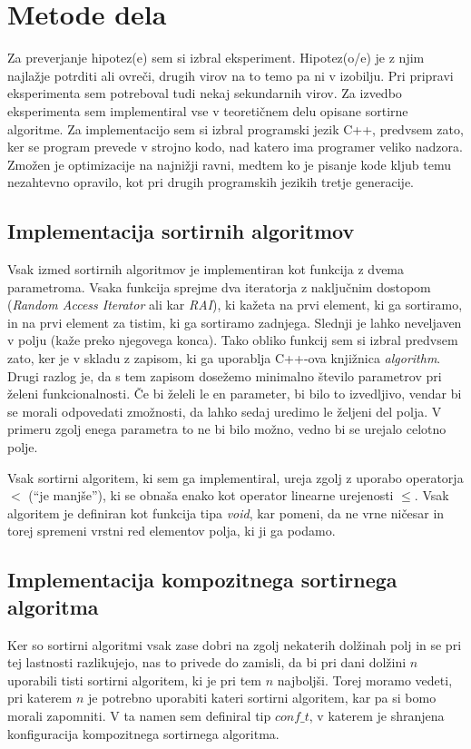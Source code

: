 \documentclass[a4paper,oneside,12pt]{article}
\begin{document}
\section{Metode dela}
Za preverjanje hipotez(e) sem si izbral eksperiment. Hipotez(o/e) je z njim najlažje
potrditi ali ovreči, drugih virov na to temo pa ni v izobilju. Pri pripravi eksperimenta
sem potreboval tudi nekaj sekundarnih virov. Za izvedbo eksperimenta sem implementiral vse 
v teoretičnem delu opisane sortirne algoritme. Za implementacijo sem si izbral programski 
jezik C++, predvsem zato, ker se program prevede v strojno kodo, nad katero ima programer
veliko nadzora. Zmožen je optimizacije na najnižji ravni, medtem ko je pisanje kode kljub
temu nezahtevno opravilo, kot pri drugih programskih jezikih tretje generacije.

\subsection{Implementacija sortirnih algoritmov}
\label{chapter:sortimplementation}
Vsak izmed sortirnih algoritmov je implementiran kot funkcija z dvema parametroma.
Vsaka funkcija sprejme dva iteratorja z naključnim dostopom (\emph{Random Access
Iterator} ali kar \emph{RAI}),
ki kažeta na prvi element, ki ga sortiramo, in na prvi element za tistim, ki ga sortiramo
zadnjega. Slednji je lahko neveljaven v polju (kaže preko njegovega konca).
Tako obliko funkcij sem si izbral predvsem zato, ker je v skladu z zapisom, ki ga uporablja
C++-ova knjižnica \emph{algorithm}. Drugi razlog je, da s tem zapisom dosežemo minimalno število
parametrov pri želeni funkcionalnosti. Če bi želeli le en parameter, bi bilo to
izvedljivo, vendar bi se morali odpovedati zmožnosti, da lahko sedaj uredimo le željeni
del polja. V primeru zgolj enega parametra to ne bi bilo možno, vedno bi se
urejalo celotno polje.

Vsak sortirni algoritem, ki sem ga implementiral, ureja zgolj z uporabo operatorja $<$
(``je manjše''), ki se obnaša enako kot operator linearne urejenosti $\leq$. Vsak
algoritem je definiran kot funkcija tipa \emph{void}, kar pomeni, da ne vrne ničesar in
torej spremeni vrstni red elementov polja, ki ji ga podamo.

\subsection{Implementacija kompozitnega sortirnega algoritma}
\label{chapter:tweaksort}
Ker so sortirni algoritmi vsak zase dobri na zgolj nekaterih dolžinah polj in se pri tej
lastnosti razlikujejo, nas to privede do zamisli, da bi pri dani dolžini $n$ uporabili tisti
sortirni algoritem, ki je pri tem $n$ najboljši. Torej moramo vedeti, pri katerem $n$ je
potrebno uporabiti kateri sortirni algoritem, kar pa si bomo morali zapomniti. V ta
namen sem definiral tip $conf\_t$, v katerem je shranjena konfiguracija kompozitnega
sortirnega algoritma. 
\end{document}
